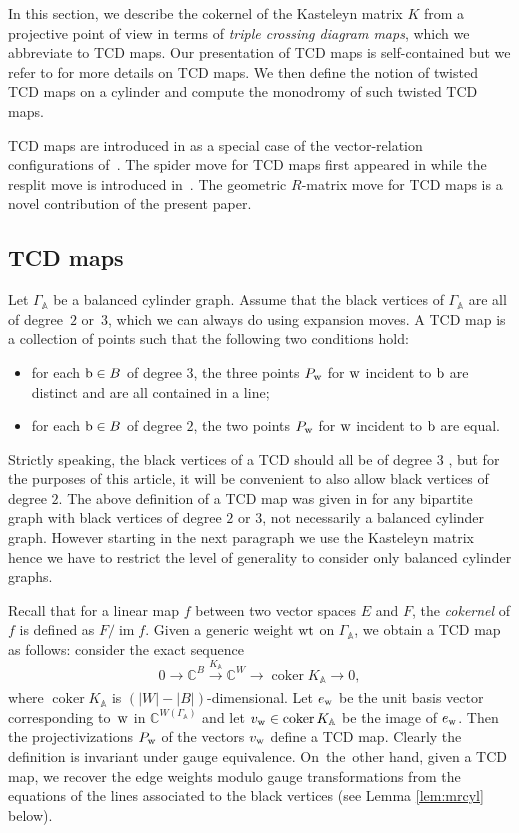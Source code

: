 \documentclass[pdftex]{sigma}
\numberwithin{equation}{section}
\newcommand{\C}{{\mathbb C}}
\newcommand{\CP}{{\mathbb C\mathrm P}}
\newcommand{\A}{{\mathbb A}}
\newcommand{\ra}{\rightarrow}
\newcommand{\w}{{\rm w}}
\newcommand{\wt}{{\rm wt}}
\DeclareMathOperator{\coker}{coker}
\DeclareMathOperator{\im}{im}
\begin{document}
	In this section, we describe the cokernel of the Kasteleyn matrix $K$ from a projective point of view in terms of \emph{triple crossing diagram maps}, which we abbreviate to TCD maps. Our presentation of TCD maps is self-contained but we refer to \cite{AGPR,AGR} for more details on TCD maps. We then define the notion of twisted TCD maps on a cylinder and compute the monodromy of such twisted TCD maps.
	
	TCD maps are introduced in \cite{AGR, athesis} as a special case of the vector-relation configurations of~\cite{AGPR}. The spider move for TCD maps first appeared in \cite{AGPR} while the resplit move is introduced in~\cite{AGR, athesis}. The geometric $R$-matrix move for TCD maps is a novel contribution of the present paper.
	
	\subsection{TCD maps}
	\label{subsec:tcdmaps}
	
	Let $\Gamma_\A$ be a balanced cylinder graph. Assume that the black vertices of $\Gamma_\A$ are all of degree~$2$ or~$3$, which we can always do using expansion moves. A TCD map is a collection of points \smash{$(P_{\rm w})_{{\rm w}\in W} \in \CP^{|W|-|B|-1}$} such that the following two conditions hold:
	\begin{itemize}\itemsep=0pt
		\item for each ${\rm b} \in B$ of degree $3$, the three points $P_{\rm w}$ for ${\rm w}$ incident to ${\rm b}$ are distinct and are all contained in a line;
		\item for each ${\rm b} \in B$ of degree $2$, the two points $P_{\rm w}$ for ${\rm w}$ incident to ${\rm b}$ are equal.
	\end{itemize}
	Strictly speaking, the black vertices of a TCD should all be of degree $3$ \cite{thurston}, but for the purposes of this article, it will be convenient to also allow black vertices of degree $2$. The above definition of a TCD map was given in \cite{AGR} for any bipartite graph with black vertices of degree $2$ or $3$, not necessarily a balanced cylinder graph. However starting in the next paragraph we use the Kasteleyn matrix hence we have to restrict the level of generality to consider only balanced cylinder graphs.
	
	
	Recall that for a linear map $f$ between two vector spaces $E$ and $F$, the \emph{cokernel} of $f$ is defined as $F/\im f$. Given a generic weight $\wt$ on $\Gamma_\A$, we obtain a TCD map as follows: consider the exact sequence
	\[
	0 \ra \C^{B} \xrightarrow[]{K_\A} \C^{W} \ra \coker K_\A \ra 0,
	\]
	where $\coker K_\A$ is ${(|W|-|B|)}$-dimensional. Let $e_\w$ be the unit basis vector corresponding to~$\w$ in $\C^{W(\Gamma_{\A})}$ and let $v_{\rm w} \in \coker K_\A$ be the image of $e_{\rm w}$. Then the projectivizations $P_{\rm w}$ of the vectors $v_{\rm w}$ define a TCD map. Clearly the definition is invariant under gauge equivalence. On~the~other hand, given a TCD map, we recover the edge weights modulo gauge transformations from the equations of the lines associated to the black vertices (see Lemma \ref{lem:mrcyl} below).
	
\end{document}
